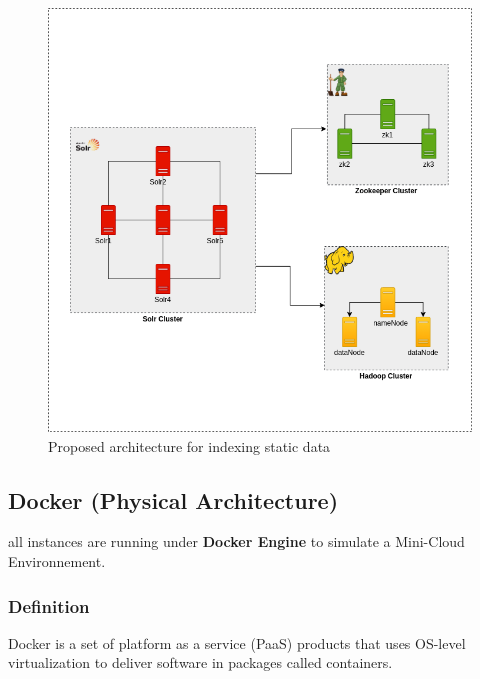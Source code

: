 \begin{figure}[!htb]
    \begin{center}
        \includegraphics[scale=0.5]{images/l_architecture.png}        
    \end{center}
    \caption[Logical Architecture - Indexing Framework]{Proposed architecture for indexing static data}
\end{figure}

\subsection{Docker (Physical Architecture)}
all instances are running under \textbf{Docker Engine} to simulate a Mini-Cloud Environnement.
\subsubsection{Definition}
Docker is a set of platform as a service (PaaS) products that uses OS-level virtualization to deliver software in packages called containers.
